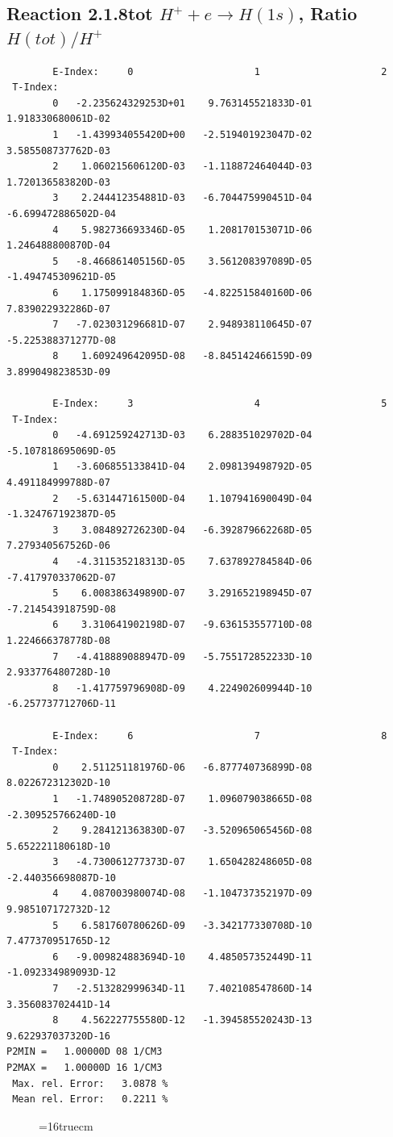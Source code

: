 \documentclass[12pt,dvipdfmx]{article}
\begin{document}
\subsection{
Reaction 2.1.8tot  $H^+ + e \rightarrow H(1s) $, Ratio $H(tot)/H^+$
}

\begin{small}\begin{verbatim}
        E-Index:     0                     1                     2
 T-Index:
        0   -2.235624329253D+01    9.763145521833D-01    1.918330680061D-02
        1   -1.439934055420D+00   -2.519401923047D-02    3.585508737762D-03
        2    1.060215606120D-03   -1.118872464044D-03    1.720136583820D-03
        3    2.244412354881D-03   -6.704475990451D-04   -6.699472886502D-04
        4    5.982736693346D-05    1.208170153071D-06    1.246488800870D-04
        5   -8.466861405156D-05    3.561208397089D-05   -1.494745309621D-05
        6    1.175099184836D-05   -4.822515840160D-06    7.839022932286D-07
        7   -7.023031296681D-07    2.948938110645D-07   -5.225388371277D-08
        8    1.609249642095D-08   -8.845142466159D-09    3.899049823853D-09

        E-Index:     3                     4                     5
 T-Index:
        0   -4.691259242713D-03    6.288351029702D-04   -5.107818695069D-05
        1   -3.606855133841D-04    2.098139498792D-05    4.491184999788D-07
        2   -5.631447161500D-04    1.107941690049D-04   -1.324767192387D-05
        3    3.084892726230D-04   -6.392879662268D-05    7.279340567526D-06
        4   -4.311535218313D-05    7.637892784584D-06   -7.417970337062D-07
        5    6.008386349890D-07    3.291652198945D-07   -7.214543918759D-08
        6    3.310641902198D-07   -9.636153557710D-08    1.224666378778D-08
        7   -4.418889088947D-09   -5.755172852233D-10    2.933776480728D-10
        8   -1.417759796908D-09    4.224902609944D-10   -6.257737712706D-11

        E-Index:     6                     7                     8
 T-Index:
        0    2.511251181976D-06   -6.877740736899D-08    8.022672312302D-10
        1   -1.748905208728D-07    1.096079038665D-08   -2.309525766240D-10
        2    9.284121363830D-07   -3.520965065456D-08    5.652221180618D-10
        3   -4.730061277373D-07    1.650428248605D-08   -2.440356698087D-10
        4    4.087003980074D-08   -1.104737352197D-09    9.985107172732D-12
        5    6.581760780626D-09   -3.342177330708D-10    7.477370951765D-12
        6   -9.009824883694D-10    4.485057352449D-11   -1.092334989093D-12
        7   -2.513282999634D-11    7.402108547860D-14    3.356083702441D-14
        8    4.562227755580D-12   -1.394585520243D-13    9.622937037320D-16
P2MIN =   1.00000D 08 1/CM3
P2MAX =   1.00000D 16 1/CM3
 Max. rel. Error:   3.0878 %
 Mean rel. Error:   0.2211 %

\end{verbatim}\end{small}
\begin{figure} \label{2.1.8rtot}
\epsfxsize=16truecm
\end{figure}
\newpage
\end{document}
